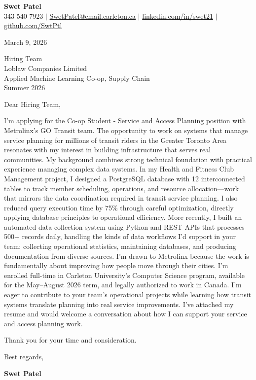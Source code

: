 \documentclass[letterpaper,11pt]{article}
\begin{document}
\begin{center}
    \textbf{\Large Swet Patel} \\[4pt]
    \small 343-540-7923 $|$
    \href{mailto:SwetPatel@cmail.carleton.ca}{SwetPatel@cmail.carleton.ca} $|$
    \href{https://linkedin.com/in/swet21}{linkedin.com/in/swet21} $|$
    \href{https://github.com/SwtPtl}{github.com/SwtPtl}
\end{center}

\vspace{8pt}
March 9, 2026

\vspace{8pt}
Hiring Team \\
Loblaw Companies Limited \\
Applied Machine Learning Co-op, Supply Chain \\
Summer 2026

\vspace{12pt}
Dear Hiring Team,


I'm applying for the Co-op Student - Service and Access Planning position with Metrolinx's GO Transit team. The opportunity to work on systems that manage service planning for millions of transit riders in the Greater Toronto Area resonates with my interest in building infrastructure that serves real communities. \vspace{12pt} My background combines strong technical foundation with practical experience managing complex data systems. In my Health and Fitness Club Management project, I designed a PostgreSQL database with 12 interconnected tables to track member scheduling, operations, and resource allocation—work that mirrors the data coordination required in transit service planning. I also reduced query execution time by 75\% through careful optimization, directly applying database principles to operational efficiency. More recently, I built an automated data collection system using Python and REST APIs that processes 500+ records daily, handling the kinds of data workflows I'd support in your team: collecting operational statistics, maintaining databases, and producing documentation from diverse sources. \vspace{12pt} I'm drawn to Metrolinx because the work is fundamentally about improving how people move through their cities. I'm enrolled full-time in Carleton University's Computer Science program, available for the May–August 2026 term, and legally authorized to work in Canada. I'm eager to contribute to your team's operational projects while learning how transit systems translate planning into real service improvements. I've attached my resume and would welcome a conversation about how I can support your service and access planning work.

\vspace{12pt}
Thank you for your time and consideration.

\vspace{16pt}
Best regards,

\vspace{4pt}
\textbf{Swet Patel}
\end{document}
